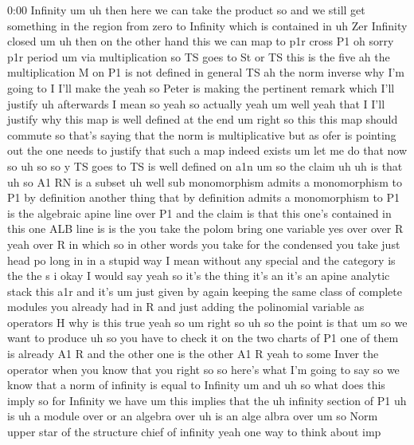 \begin{unfinished}{0:00}
Infinity  um  uh  then  here  we  can  take  the
product
so  and  we  still  get  something  in  the
region  from  zero  to  Infinity  which  is
contained  in  uh  Zer  Infinity
closed
um  uh  then  on  the  other  hand  this  we  can
map  to  p1r  cross  P1  oh  sorry  p1r
period  um  via  multiplication  so
TS  goes  to  St  or
TS  this  is  the
five  ah  the  multiplication  M  on  P1  is
not  defined  in
general
TS  ah  the  norm
inverse
why  I'm  going  to  I  I'll  make  the  yeah  so
Peter  is  making  the  pertinent  remark
which  I'll  justify  uh  afterwards  I  mean
so  yeah  so  actually
yeah
um  well
yeah  that  I  I'll  justify  why  this  map  is
well  defined  at  the  end
um  right  so  this  this  map  should
commute  so  that's  saying  that  the  norm
is  multiplicative  but  as  ofer  is
pointing  out  the  one  needs  to  justify
that  such  a  map  indeed  exists  um  let  me
do  that  now  so
uh
so  so  y
TS  goes  to  TS  is  well
defined  on
a1n  um  so  the  claim
uh  uh  is  that  uh  so  A1  RN  is  a  subset  uh
well  sub  monomorphism  admits  a
monomorphism  to  P1  by  definition  another
thing  that  by  definition  admits  a
monomorphism  to  P1  is  the  algebraic
apine  line  over
P1  and  the  claim  is  that  this  one's
contained  in  this
one  ALB  line
is  is  the  you  take  the  polom  bring  one
variable  yes  over  over  R  yeah  over  R  in
which  so  in  other  words  you  take  for  the
condensed  you  take  just  head  po  long  in
in  a  stupid  way  I  mean  without  any
special  and  the  category  is  the  the  s  i
okay  I  would  say  yeah  so  it's  the  thing
it's  an  it's  an  apine  analytic  stack
this  a1r  and  it's  um  just  given  by  again
keeping  the  same  class  of  complete
modules  you  already  had  in  R  and  just
adding  the  polinomial  variable  as
operators  H  why  is  this  true  yeah
so  um
right
so
uh  so  the  point  is  that
um  so  we  want  to  produce  uh  so  you  have
to  check  it  on  the  two  charts  of  P1  one
of  them  is  already  A1  R  and  the  other
one  is  the  other  A1  R  yeah  to  some  Inver
the  operator  when  you  know  that  you
right  so  so  here's  what  I'm  going  to  say
so  we  know  that  a  norm  of  infinity  is
equal  to
Infinity
um  and  uh  so  what  does  this  imply  so  for
Infinity  we  have
um  this  implies  that  the  uh  infinity
section  of
P1  uh  is  uh  a  module  over  or  an  algebra
over  uh  is  an  alge  albra  over  um  so  Norm
upper  star  of  the  structure  chief  of
infinity  yeah  one  way  to  think  about  imp

\end{unfinished}
